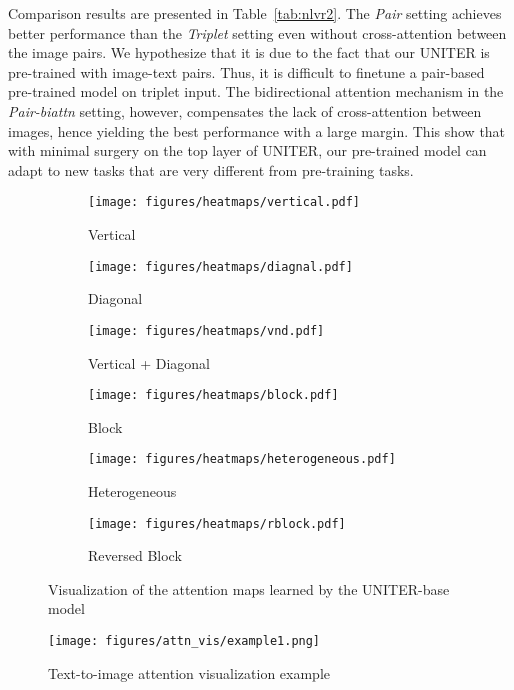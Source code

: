 \documentclass[runningheads]{llncs}
\begin{document}
Comparison results are presented in Table~\ref{tab:nlvr2}. The \emph{Pair} setting achieves better performance than the \emph{Triplet} setting even without cross-attention between the image pairs. We hypothesize that it is due to the fact that our UNITER is pre-trained with image-text pairs. Thus, it is difficult to finetune a pair-based pre-trained model on triplet input. The bidirectional attention mechanism in the \emph{Pair-biattn} setting, however, compensates the lack of cross-attention between images, hence yielding the best performance with a large margin. This show that with minimal surgery on the top layer of UNITER, our pre-trained model can adapt to new tasks that are very different from pre-training tasks.

\begin{figure}[t!]
     \centering
     \begin{subfigure}[b]{0.32\textwidth}
         \centering
         \texttt{[image: figures/heatmaps/vertical.pdf]}
         \caption{Vertical}
         \label{subfig:vertical}
     \end{subfigure}
     \hfill
     \begin{subfigure}[b]{0.32\textwidth}
         \centering
         \texttt{[image: figures/heatmaps/diagnal.pdf]}
         \caption{Diagonal}
         \label{subfig:diagonal}
     \end{subfigure}
     \hfill
     \begin{subfigure}[b]{0.32\textwidth}
         \centering
         \texttt{[image: figures/heatmaps/vnd.pdf]}
         \caption{Vertical + Diagonal}
         \label{subfig:vnd}
     \end{subfigure}
        
     
     \begin{subfigure}[b]{0.32\textwidth}
         \centering
         \texttt{[image: figures/heatmaps/block.pdf]}
         \caption{Block}
         \label{subfig:block}
     \end{subfigure}
     \hfill
     \begin{subfigure}[b]{0.32\textwidth}
         \centering
         \texttt{[image: figures/heatmaps/heterogeneous.pdf]}
         \caption{Heterogeneous}
         \label{subfig:heter}
     \end{subfigure}
     \hfill
     \begin{subfigure}[b]{0.32\textwidth}
         \centering
         \texttt{[image: figures/heatmaps/rblock.pdf]}
         \caption{Reversed Block}
         \label{subfig:rblock}
     \end{subfigure}
\caption{\small{Visualization of the attention maps learned by the UNITER-base model}}
\label{fig:heatmaps}
\end{figure} 
\begin{figure*}[!t]
  \texttt{[image: figures/attn\_vis/example1.png]} \\
 \caption{\small{Text-to-image attention visualization example}}
  \label{fig:vis1}
\end{figure*} 
\end{document}
